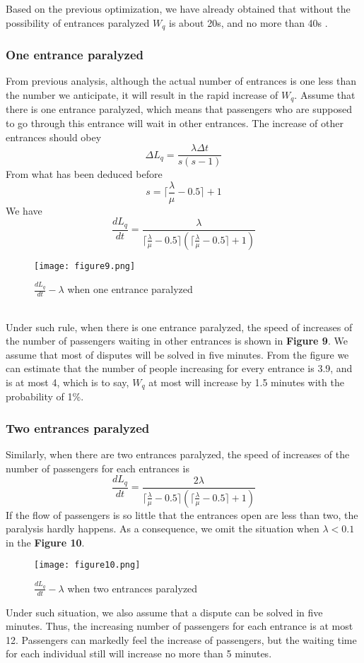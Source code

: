 \documentclass{mcmthesis}
\begin{document}
	Based on the previous optimization, we have already obtained that without the possibility of entrances paralyzed $W_q$ is about 20s, and no more than 40s .
	\subsubsection{One entrance paralyzed}
	From previous analysis, although the actual number of entrances is one less than the number we anticipate, it will result in the rapid increase of $W_q$. Assume that there is one entrance paralyzed, which means that passengers who are supposed to go through this entrance will wait in other entrances. The increase of other entrances should obey
	$$\Delta L_q=\frac{\lambda\Delta t}{s(s-1)}$$
	From what has been deduced before
	$$s=\lceil\frac{\lambda}{\mu}-0.5\rceil+1$$
	We have
	$$\frac{dL_q}{dt}=\frac{\lambda}{\lceil\frac{\lambda}{\mu}-0.5\rceil(\lceil\frac{\lambda}{\mu}-0.5\rceil +1)}$$
	\begin{figure}[h]
		\small
		\centering
		\texttt{[image: figure9.png]}
		\caption{$\frac{dL_q}{dt}-\lambda$ when one entrance paralyzed} \label{fig:9}
	\end{figure}\\
	Under such rule, when there is one entrance paralyzed, the speed of increases of the number of passengers waiting in other entrances is shown in \textbf{Figure 9}. We assume that most of disputes will be solved in five minutes. From the figure we can estimate that the number of people increasing for every entrance is 3.9, and is at most 4, which is to say, $W_q$ at most will increase by 1.5 minutes with the probability of 1\%.
	\subsubsection{Two entrances paralyzed}
	Similarly, when there are two entrances paralyzed, the speed of increases of the number of passengers for each entrances is
	$$\frac{dL_q}{dt}=\frac{2\lambda}{\lceil\frac{\lambda}{\mu}-0.5\rceil(\lceil\frac{\lambda}{\mu}-0.5\rceil +1)}$$
	If the flow of passengers is so little that the entrances open are less than two, the paralysis hardly happens. As a consequence, we omit the situation when $\lambda<0.1$ in the \textbf{Figure 10}.
	\begin{figure}[h]
		\small
		\centering
		\texttt{[image: figure10.png]}
		\caption{$\frac{dL_q}{dt}-\lambda$ when two entrances paralyzed} \label{fig:10}
	\end{figure}
	Under such situation, we also assume that a dispute can be solved in five minutes. Thus, the increasing number of passengers for each entrance is at most 12. Passengers can markedly feel the increase of passengers, but the waiting time for each individual still will increase no more than 5 minutes.
	
\end{document}
